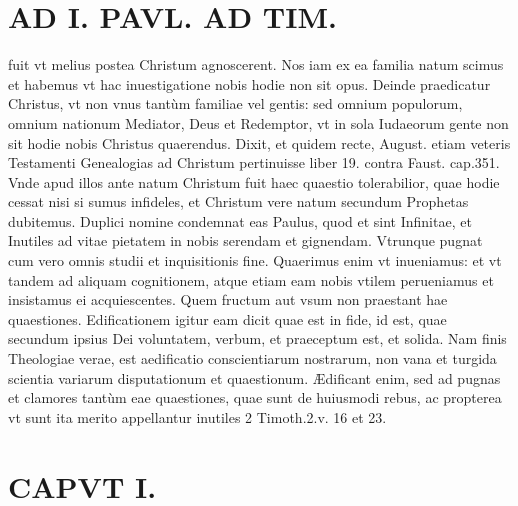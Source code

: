 \documentclass{article}
\begin{document}
\begin{pages}
\section*{AD I. PAVL. AD TIM. }
\marginpar{[ p.12 ]}\pstart fuit vt melius postea Christum agnoscerent. Nos iam ex ea familia natum scimus et habemus vt hac inuestigatione nobis hodie non sit opus. Deinde praedicatur Christus, vt non vnus tantùm familiae vel gentis: sed omnium populorum, omnium nationum Mediator, Deus et Redemptor, vt in sola Iudaeorum gente non sit hodie nobis Christus quaerendus. Dixit, et quidem recte, August. etiam veteris Testamenti Genealogias ad Christum pertinuisse liber 19. contra Faust. cap.351. Vnde apud illos ante natum Christum fuit haec quaestio tolerabilior, quae hodie cessat nisi si sumus infideles, et Christum vere natum secundum Prophetas dubitemus.  \pend\pstart Duplici nomine condemnat eas Paulus, quod et sint Infinitae, et Inutiles ad vitae pietatem in nobis serendam et gignendam. Vtrunque pugnat cum vero omnis studii et inquisitionis fine. Quaerimus enim vt inueniamus: et vt tandem ad aliquam cognitionem, atque etiam eam nobis vtilem perueniamus et insistamus ei acquiescentes. Quem fructum aut vsum non praestant hae quaestiones. Edificationem igitur eam dicit quae est in fide, id est, quae secundum ipsius Dei voluntatem, verbum, et praeceptum est, et solida. Nam finis Theologiae verae, est aedificatio conscientiarum nostrarum, non vana et turgida scientia variarum disputationum et quaestionum. Ædificant enim, sed ad pugnas et clamores tantùm eae quaestiones, quae sunt de huiusmodi rebus, ac propterea vt sunt ita merito appellantur inutiles 2 Timoth.2.v. 16 et 23.  \pend
\section*{CAPVT I. }
\marginpar{[ p.13 ]}
{}

\end{pages}
\end{document}
